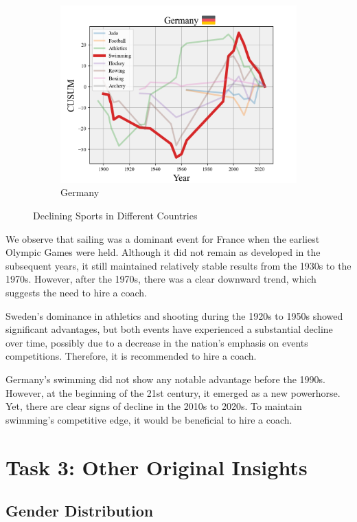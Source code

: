 \documentclass[12pt]{article}  %
\begin{document}
\begin{figure}[H]
\begin{subfigure}[b]{.32\textwidth}
		\includegraphics[width=\textwidth]{img/Decline3.png}
		\caption{Germany}\label{subfig:3}
	\end{subfigure}
	\caption{Declining Sports in Different Countries}\label{fig:subfigures}
\end{figure}

We observe that sailing was a dominant event for France when the earliest Olympic Games were held. Although it did not remain as developed in the subsequent years, it still maintained relatively stable results from the 1930s to the 1970s. However, after the 1970s, there was a clear downward trend, which suggests the need to hire a coach.

Sweden's dominance in athletics and shooting during the 1920s to 1950s showed significant advantages, but both events have experienced a substantial decline over time, possibly due to a decrease in the nation's emphasis on events competitions. Therefore, it is recommended to hire a coach.

Germany’s swimming did not show any notable advantage before the 1990s. However, at the beginning of the 21st century, it emerged as a new powerhorse. Yet, there are clear signs of decline in the 2010s to 2020s. To maintain swimming’s competitive edge, it would be beneficial to hire a coach.



\section{Task 3: Other Original Insights}

\subsection{Gender Distribution}
\end{document}
